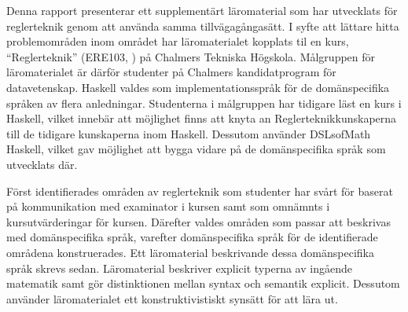 Denna rapport presenterar ett supplementärt läromaterial som har utvecklats för reglerteknik
genom att använda samma tillvägagångasätt. I syfte att lättare hitta problemområden inom området har läromaterialet kopplats til en kurs, ``Reglerteknik'' (ERE103, \cite{ERE103}) på Chalmers Tekniska Högskola. Målgruppen för läromaterialet är därför 
studenter på Chalmers kandidatprogram för datavetenskap. Haskell valdes som implementationsspråk för de domänspecifika språken av flera anledningar. 
Studenterna i målgruppen har tidigare läst en kurs i Haskell, vilket innebär att möjlighet finns att knyta an Reglerteknikkunskaperna till de tidigare kunskaperna inom Haskell. %
Dessutom använder DSLsofMath Haskell, vilket gav möjlighet att bygga vidare på de domänspecifika språk som utvecklats där. 

Först identifierades områden av reglerteknik som studenter har svårt för baserat på kommunikation med examinator i kursen samt som omnämnts i kursutvärderingar för kursen. 
Därefter valdes områden som passar att beskrivas med domänspecifika språk, varefter domänspecifika språk för de identifierade områdena konstruerades. Ett läromaterial beskrivande dessa domänspecifika språk skrevs sedan. Läromaterial beskriver explicit typerna av ingående matematik samt gör distinktionen mellan syntax och semantik explicit. Dessutom använder läromaterialet ett konstruktivistiskt synsätt för att lära ut. 



